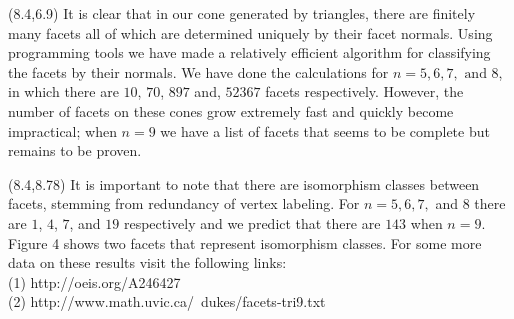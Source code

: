 \documentclass[a0,landscape]{a0poster}  %
\theoremstyle{plain}
\begin{document}
\begin{textblock}{8}(8.4,6.9)
\large{It is clear that in our cone generated by triangles, there are finitely many facets all of which are determined uniquely by their facet normals. Using programming tools we have made a relatively efficient algorithm for classifying the facets by their normals. We have done the calculations for $n=5,6,7, \text{ and }8$, in which there are $10$, $70$, $897$ and, $52367$ facets  respectively. However, the number of facets on these cones grow extremely fast and quickly become impractical; when $n=9$ we have a list of facets that seems to be complete but remains to be proven. }
\end{textblock}

\begin{textblock}{6}(8.4,8.78)
\large{It is important to note that there are isomorphism classes between facets, stemming from redundancy of vertex labeling. For $n=5,6,7,$ and $8$ there are $1$, $4$, $7$, and $19$ respectively and we predict that there are $143$ when $n=9$. Figure 4 shows two facets that represent isomorphism classes. For some more data on these results visit the following links:} \\ (1)  http://oeis.org/A246427 \\(2) http://www.math.uvic.ca/~dukes/facets-tri9.txt 
\end{textblock}
\end{document}
